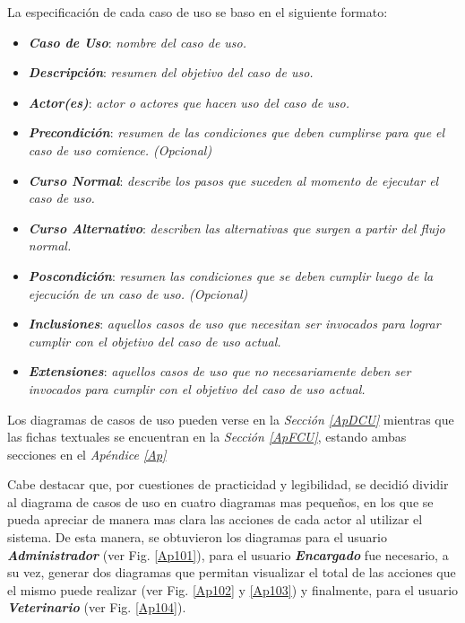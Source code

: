 \documentclass[11pt,oneside]{book}
\begin{document}
La especificación de cada caso de uso se baso en el siguiente formato:
\begin{itemize}
\item \textit{\textbf{Caso de Uso}}: \textit{nombre del caso de uso.}
\item \textit{\textbf{Descripción}}: \textit{resumen del objetivo del caso de uso.}
\item \textit{\textbf{Actor(es)}}: \textit{actor o actores que hacen uso del caso de uso.}
\item \textit{\textbf{Precondición}}: \textit{resumen de las condiciones que deben cumplirse para que el caso de uso comience. (Opcional)}
\item \textit{\textbf{Curso Normal}}: \textit{describe los pasos que suceden al momento de ejecutar el caso de uso.}
\item \textit{\textbf{Curso Alternativo}}: \textit{describen las alternativas que surgen a partir del flujo normal.}
\item \textit{\textbf{Poscondición}}: \textit{resumen las condiciones que se deben cumplir luego de la ejecución de un caso de uso. (Opcional)}
\item \textit{\textbf{Inclusiones}}: \textit{aquellos casos de uso que necesitan ser invocados para lograr cumplir con el objetivo del caso de uso actual.}
\item \textit{\textbf{Extensiones}}: \textit{aquellos casos de uso que no necesariamente deben ser invocados para cumplir con el objetivo del caso de uso actual.}
\end{itemize}

Los diagramas de casos de uso pueden verse en la \textit{Sección \ref{ApDCU}} mientras que las fichas textuales se encuentran en la \textit{Sección \ref{ApFCU}}, estando ambas secciones en el \textit{Apéndice \ref{Ap}} 

Cabe destacar que, por cuestiones de practicidad y legibilidad, se decidió dividir al diagrama de casos de uso en cuatro diagramas mas pequeños, en los que se pueda apreciar de manera mas clara las acciones de cada actor al utilizar el sistema. De esta manera, se obtuvieron los diagramas para el usuario \textit{\textbf{Administrador}} (ver Fig. \eqref{Ap101}), para el usuario \textit{\textbf{Encargado}} fue necesario, a su vez, generar dos diagramas que permitan visualizar el total de las acciones que el mismo puede realizar (ver Fig. \eqref{Ap102} y \eqref{Ap103}) y finalmente, para el usuario \textit{\textbf{Veterinario}} (ver Fig. \eqref{Ap104}).
\end{document}
